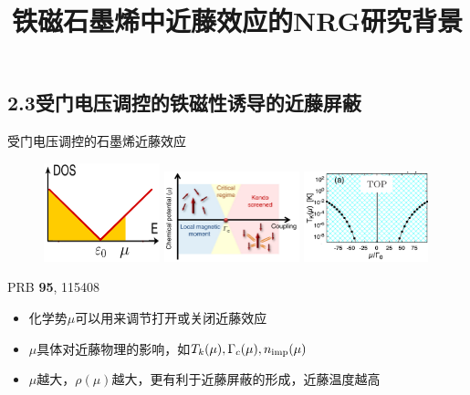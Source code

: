 \documentclass[9pt,t]{beamer} %
\begin{document}
\subsection{2.3受门电压调控的铁磁性诱导的近藤屏蔽}
\title{铁磁石墨烯中近藤效应的NRG研究\qquad \qquad \qquad \qquad 背景}
\begin{frame}{受门电压调控的石墨烯近藤效应}
\begin{figure}
\includegraphics[width=0.3\textwidth]{gated-dos.png}
\includegraphics[width=0.35\textwidth]{phasediagram.png}
\includegraphics[width=0.32\textwidth]{tk-mu.png}
\end{figure}
\hspace{9cm}PRB \textbf{95}, 115408
\vspace{0.7cm}
\begin{itemize}
\setlength\itemsep{0.4em}
\item 化学势$\mu$可以用来调节打开或关闭近藤效应
\item $\mu$具体对近藤物理的影响，如$T_{k}(\mu), \Gamma_{c}(\mu), n_{\rm{imp}}(\mu)$
\item $\mu$越大，$\rho(\mu)$越大，更有利于近藤屏蔽的形成，近藤温度越高
\end{itemize}
\end{frame}
\end{document}
